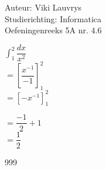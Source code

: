 \documentclass[a4paper]{article}
\begin{document}
  
\noindent \large Auteur: Viki	Lauvrys \\
\noindent \large Studierichting: Informatica\\
\noindent \large Oefeningenreeks 5A nr. 4.6\\

\medskip

\normalsize

$ \displaystyle\int^2_1 \dfrac{dx}{x^2} $ \\

$ = \left[ \dfrac{x^{-1}}{-1} \right]^2_1 $ \\

$ = \left[ -x^{-1} \right]^2_1 $ \

$ = \dfrac{-1}{2} +1 $ \\

$ = \dfrac{1}{2} $ \\


\begin{thebibliography}{999}
\end{thebibliography}
\end{document}

